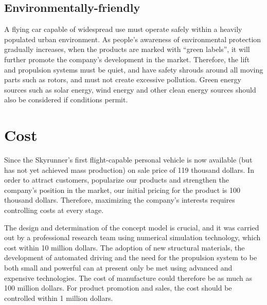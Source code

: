 \subsection{Environmentally-friendly}

A flying car capable of widespread use must operate safely within a heavily populated urban environment. As people's awareness of environmental protection gradually increases, when the products are marked with “green labels”, it will further promote the company's development in the market. Therefore, the lift and propulsion systems must be quiet, and have safety shrouds around all moving parts such as rotors, and must not create excessive pollution. Green energy sources such as solar energy, wind energy and other clean energy sources should also be considered if conditions permit.

\section{Cost}

Since the Skyrunner’s first flight-capable personal vehicle is now available (but has not yet achieved mass production) on sale price of 119 thousand dollars. In order to attract customers, popularize our products and strengthen the company's position in the market, our initial pricing for the product is 100 thousand dollars. Therefore, maximizing the company's interests requires controlling costs at every stage.

The design and determination of the concept model is crucial, and it was carried out by a professional research team using numerical simulation technology, which cost within 10 million dollars. The adoption of new structural materials, the development of automated driving and the need for the propulsion system to be both small and powerful can at present only be met using advanced and expensive technologies. The cost of manufacture could therefore be as much as 100 million dollars. For product promotion and sales, the cost should be controlled within 1 million dollars.



